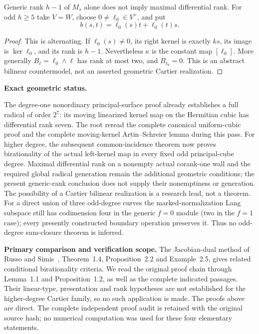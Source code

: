 \begin{example}
\label{ex:root-kernel-compression-countermodel}
Generic rank $h-1$ of $M_s$ alone does not imply maximal differential
rank. For odd $h\geq5$ take $V=W$, choose $0\ne\ell_0\in V^\vee$,
and put
\[
                  b(s,t)=\ell_0(s)t+\ell_0(t)s.
\]
\end{example}
\begin{proof}
This is alternating. If $\ell_0(s)\ne0$, its right kernel is exactly
$ks$, its image is $\ker\ell_0$, and its rank is $h-1$.
Nevertheless $\kappa$ is the constant map $[\ell_0]$.
More generally $B_\ell=\ell_0\wedge\ell$ has rank at most two,
and $B_{\ell_0}=0$. This is an abstract bilinear countermodel, not
an asserted geometric Cartier realization.
\end{proof}

\par\smallskip\noindent\textbf{Exact geometric status.}

The degree-one nonordinary principal-surface proof already establishes
a full radical of order $2^7$: its moving linearized kernel map on
the Hermitian cubic has differential rank seven. The root reread the
complete canonical uniform-cubic proof and the complete moving-kernel
Artin--Schreier lemma during this pass. For higher degree, the subsequent common-incidence theorem now
proves birationality of the actual left-kernel map in every fixed odd
principal-cube degree. Maximal differential rank on a nonempty actual
corank-one wall and the required global radical generation remain the
additional geometric conditions; the present generic-rank conclusion
does not supply their nonemptiness or generation. The possibility
of a Cartier bilinear realization is a research lead, not a theorem.
For a direct union of three odd-degree curves the marked-normalization
Lang subspace still has codimension four in the generic $f=0$ module
(two in the $f=1$ case); every presently constructed boundary operation
preserves it. Thus no odd-degree sum-closure theorem is inferred.

\par\smallskip\noindent\textbf{Primary comparison and verification scope.}
The Jacobian-dual method of Russo and Simis~\cite{RussoSimis2001Birational},
Theorem~1.4, Proposition~2.2 and Example~2.5, gives related conditional
birationality criteria. We read the original proof chain through
Lemma~1.1 and Proposition~1.2, as well as the complete indicated passages.
Their linear-type, presentation and rank hypotheses are not established
for the higher-degree Cartier family, so no such application is made.
The proofs above are direct. The complete independent proof audit is
retained with the original source hash; no numerical computation was
used for these four elementary statements.
